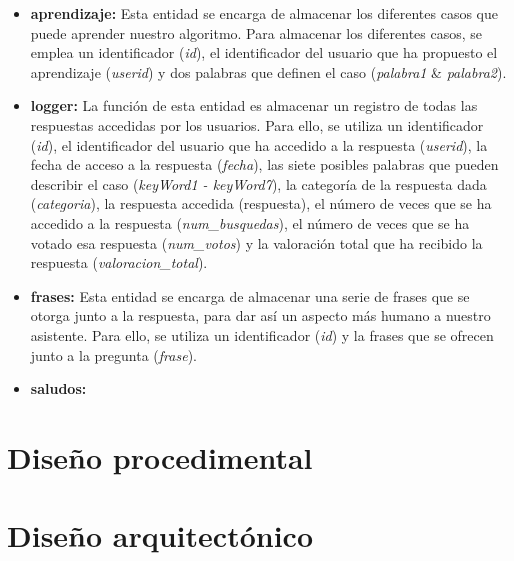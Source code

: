 \begin{itemize}
	\tightlist
	\item
	\textbf{aprendizaje:} Esta entidad se encarga de almacenar los diferentes casos que puede aprender nuestro algoritmo. Para almacenar los diferentes casos, se emplea un identificador (\textit{id}), el identificador del usuario que ha propuesto el aprendizaje (\textit{userid}) y dos palabras que definen el caso (\textit{palabra1} \& \textit{palabra2}). 
	\item
	\textbf{logger:} La función de esta entidad es almacenar un registro de todas las respuestas accedidas por los usuarios. Para ello, se utiliza un identificador (\textit{id}), el identificador del usuario que ha accedido a la respuesta (\textit{userid}), la fecha de acceso a la respuesta (\textit{fecha}), las siete posibles palabras que pueden describir el caso (\textit{keyWord1 - keyWord7}), la categoría de la respuesta dada (\textit{categoria}), la respuesta accedida (respuesta), el número de veces que se ha accedido a la respuesta (\textit{num\_busquedas}), el número de veces que se ha votado esa respuesta (\textit{num\_votos}) y la valoración total que ha recibido la respuesta (\textit{valoracion\_total}).
	\item 
	\textbf{frases:} Esta entidad se encarga de almacenar una serie de frases que se otorga junto a la respuesta, para dar así un aspecto más humano a nuestro asistente. Para ello, se utiliza un identificador (\textit{id}) y la frases que se ofrecen junto a la pregunta (\textit{frase}).
	\item 
	\textbf{saludos:}
\end{itemize}

\section{Diseño procedimental}

\section{Diseño arquitectónico}


